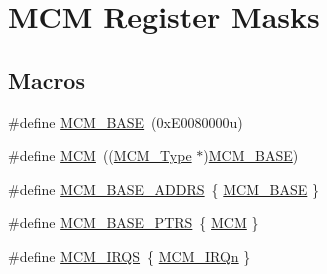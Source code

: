 \hypertarget{group___m_c_m___register___masks}{}\section{M\+CM Register Masks}
\label{group___m_c_m___register___masks}
\subsection*{Macros}
\begin{DoxyCompactItemize}
\item 
\#define \mbox{\hyperlink{group___m_c_m___register___masks_ga84250d5694181f040a437d9125af3fac}{M\+C\+M\+\_\+\+B\+A\+SE}}~(0x\+E0080000u)
\item 
\#define \mbox{\hyperlink{group___m_c_m___register___masks_ga4cd2dcee5e786e36844ed653cfa40096}{M\+CM}}~((\mbox{\hyperlink{struct_m_c_m___type}{M\+C\+M\+\_\+\+Type}} $\ast$)\mbox{\hyperlink{group___m_c_m___register___masks_ga84250d5694181f040a437d9125af3fac}{M\+C\+M\+\_\+\+B\+A\+SE}})
\item 
\#define \mbox{\hyperlink{group___m_c_m___register___masks_ga240172b40ddf9d12c884fb331539f5e9}{M\+C\+M\+\_\+\+B\+A\+S\+E\+\_\+\+A\+D\+D\+RS}}~\{ \mbox{\hyperlink{group___m_c_m___register___masks_ga84250d5694181f040a437d9125af3fac}{M\+C\+M\+\_\+\+B\+A\+SE}} \}
\item 
\#define \mbox{\hyperlink{group___m_c_m___register___masks_gae2d5e838ce7d2d4108738c05bf224272}{M\+C\+M\+\_\+\+B\+A\+S\+E\+\_\+\+P\+T\+RS}}~\{ \mbox{\hyperlink{group___m_c_m___register___masks_ga4cd2dcee5e786e36844ed653cfa40096}{M\+CM}} \}
\item 
\#define \mbox{\hyperlink{group___m_c_m___register___masks_gac60ca8f617b85ec161957b21d024e070}{M\+C\+M\+\_\+\+I\+R\+QS}}~\{ \mbox{\hyperlink{group___interrupt__vector__numbers_gga666eb0caeb12ec0e281415592ae89083a01b35b93c12aa0867eab0aadbd39471b}{M\+C\+M\+\_\+\+I\+R\+Qn}} \}
\end{DoxyCompactItemize}
